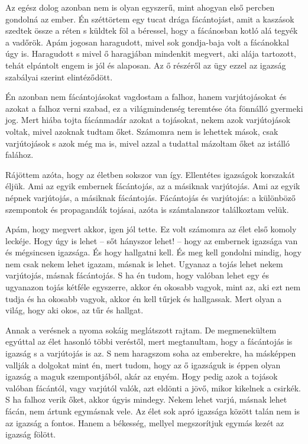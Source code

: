 \documentclass{IEEEtran}
\begin{document}
Az egész dolog azonban nem is olyan egyszerű, mint ahogyan első percben gondolná az ember. Én széttörtem egy tucat drága fácántojást, amit a kaszások szedtek össze a réten s küldtek föl a béressel, hogy a fácánosban kotló alá tegyék a vadőrök. Apám jogosan haragudott, mivel sok gondja-baja volt a fácánokkal úgy is. Haragudott s mivel ő haragjában mindenkit megvert, aki alája tartozott, tehát elpántolt engem is jól és alaposan. Az ő részéről az ügy ezzel az igazság szabályai szerint elintéződött.

Én azonban nem fácántojásokat vagdostam a falhoz, hanem varjútojásokat és azokat a falhoz verni szabad, ez a világmindenség teremtése óta fönnálló gyermeki jog. Mert hiába tojta fácánmadár azokat a tojásokat, nekem azok varjútojások voltak, mivel azoknak tudtam őket. Számomra nem is lehettek mások, csak varjútojások s azok még ma is, mivel azzal a tudattal mázoltam őket az istálló falához.

Rájöttem azóta, hogy az életben sokszor van így. Ellentétes igazságok korszakát éljük. Ami az egyik embernek fácántojás, az a másiknak varjútojás. Ami az egyik népnek varjútojás, a másiknak fácántojás. Fácántojás és varjútojás: a különböző szempontok és propagandák tojásai, azóta is számtalanszor találkoztam velük.

Apám, hogy megvert akkor, igen jól tette. Ez volt számomra az élet első komoly leckéje. Hogy úgy is lehet – sőt hányszor lehet! – hogy az embernek igazsága van és mégsincsen igazsága. És hogy hallgatni kell. És meg kell gondolni mindig, hogy nem csak nekem lehet igazam, másnak is lehet. Ugyanaz a tojás lehet nekem varjútojás, másnak fácántojás. S ha én tudom, hogy valóban lehet egy és ugyanazon tojás kétféle egyszerre, akkor én okosabb vagyok, mint az, aki ezt nem tudja és ha okosabb vagyok, akkor én kell tűrjek és hallgassak. Mert olyan a világ, hogy aki okos, az tűr és hallgat.

Annak a verésnek a nyoma sokáig meglátszott rajtam. De megmenekültem egyúttal az élet hasonló többi veréstől, mert megtanultam, hogy a fácántojás is igazság s a varjútojás is az. S nem haragszom soha az emberekre, ha másképpen vallják a dolgokat mint én, mert tudom, hogy az ő igazságuk is éppen olyan igazság a maguk szempontjából, akár az enyém. Hogy pedig azok a tojások valóban fácántól, vagy varjútól valók, azt eldönti a jövő, mikor kikelnek a csirkék. S ha falhoz verik őket, akkor úgyis mindegy. Nekem lehet varjú, másnak lehet fácán, nem ártunk egymásnak vele. Az élet sok apró igazsága között talán nem is az igazság a fontos. Hanem a békesség, mellyel megszorítjuk egymás kezét az igazság fölött.
\end{document}
